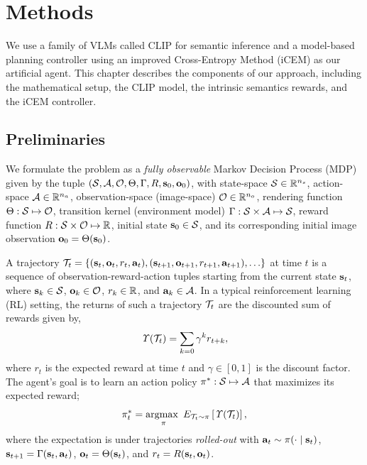 \chapter{Methods}
\label{sec:methods}

We use a family of VLMs called CLIP \citep{clip} for semantic inference and a model-based planning controller using an improved Cross-Entropy Method (iCEM) \citep{icem} as our artificial agent.
This chapter describes the components of our approach, including the mathematical setup, the CLIP model, the intrinsic semantics rewards, and the iCEM controller.

\section{Preliminaries}
\label{sec:preliminaries}
We formulate the problem as a \emph{fully observable} Markov Decision Process (MDP) given by the tuple \((\mathcal{S}, \mathcal{A}, \mathcal{O}, \Theta, \Gamma, R, \mathbf{s}_0, \mathbf{o}_0)\), with state-space \(\mathcal{S} \in \mathbb{R}^{n_s}\), action-space \(\mathcal{A} \in \mathbb{R}^{n_a}\), observation-space (image-space) \(\mathcal{O} \in \mathbb{R}^{n_o}\), rendering function \(\Theta: \mathcal{S} \mapsto \mathcal{O}\), transition kernel (environment model) \(\Gamma: \mathcal{S} \times \mathcal{A} \mapsto \mathcal{S}\), reward function \(R: \mathcal{S} \times \mathcal{O} \mapsto \mathbb{R}\), initial state \(\mathbf{s}_0 \in \mathcal{S}\), and its corresponding initial image observation \(\mathbf{o}_0 = \Theta(\mathbf{s}_0)\).

A trajectory \(\mathcal{T}_t = \{(\mathbf{s}_t, \mathbf{o}_t, r_t, \mathbf{a}_t), (\mathbf{s}_{t+1}, \mathbf{o}_{t+1}, r_{t+1}, \mathbf{a}_{t+1}), \ldots \}\) at time \(t\) is a sequence of observation-reward-action tuples starting from the current state \(\mathbf{s}_t\), where \(\mathbf{s}_k \in \mathcal{S}\), \(\mathbf{o}_k \in \mathcal{O}\), \(r_k \in \mathbb{R}\), and \(\mathbf{a}_k \in \mathcal{A}\).
In a typical reinforcement learning (RL) setting, the returns of such a trajectory \(\mathcal{T}_t\) are the discounted sum of rewards given by,
\begin{equation}
    \label{eq:rl-goal}
    \mathit{\Upsilon}(\mathcal{T}_t) = \sum_{k=0} \gamma^k r_{t+k},
\end{equation}
where \(r_t\) is the expected reward at time \(t\) and \(\gamma \in [0, 1]\) is the discount factor. The agent's goal is to learn an action policy \(\pi^*: \mathcal{S} \mapsto \mathcal{A}\) that maximizes its expected reward;
\begin{equation}
    \label{eq:rl-policy}
    \pi^*_t = \operatorname*{argmax~}_{\pi} E_{\mathcal{T}_t \sim \pi} \left[ \mathit{\Upsilon}(\mathcal{T}_t) \right],
\end{equation}
where the expectation is under trajectories \emph{rolled-out} with \(\mathbf{a}_t \sim \pi(\cdot \mid \mathbf{s}_t)\), \(\mathbf{s}_{t+1} = \Gamma(\mathbf{s}_t, \mathbf{a}_t)\), \(\mathbf{o}_t = \Theta(\mathbf{s}_t)\), and \(r_t = R(\mathbf{s}_t, \mathbf{o}_t)\).

